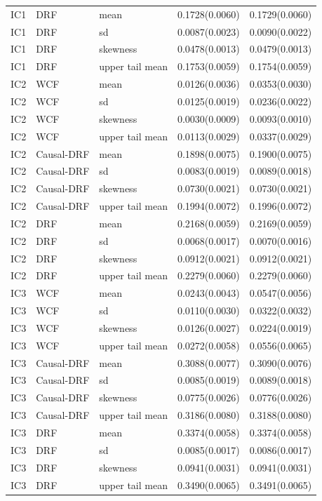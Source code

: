 \begin{longtable}{lllrr}
IC1 & DRF & mean & 0.1728(0.0060) & 0.1729(0.0060) \\
IC1 & DRF & sd & 0.0087(0.0023) & 0.0090(0.0022) \\
IC1 & DRF & skewness & 0.0478(0.0013) & 0.0479(0.0013) \\
IC1 & DRF & upper tail mean & 0.1753(0.0059) & 0.1754(0.0059) \\
IC2 & WCF & mean & 0.0126(0.0036) & 0.0353(0.0030) \\
IC2 & WCF & sd & 0.0125(0.0019) & 0.0236(0.0022) \\
IC2 & WCF & skewness & 0.0030(0.0009) & 0.0093(0.0010) \\
IC2 & WCF & upper tail mean & 0.0113(0.0029) & 0.0337(0.0029) \\
IC2 & Causal-DRF & mean & 0.1898(0.0075) & 0.1900(0.0075) \\
IC2 & Causal-DRF & sd & 0.0083(0.0019) & 0.0089(0.0018) \\
IC2 & Causal-DRF & skewness & 0.0730(0.0021) & 0.0730(0.0021) \\
IC2 & Causal-DRF & upper tail mean & 0.1994(0.0072) & 0.1996(0.0072) \\
IC2 & DRF & mean & 0.2168(0.0059) & 0.2169(0.0059) \\
IC2 & DRF & sd & 0.0068(0.0017) & 0.0070(0.0016) \\
IC2 & DRF & skewness & 0.0912(0.0021) & 0.0912(0.0021) \\
IC2 & DRF & upper tail mean & 0.2279(0.0060) & 0.2279(0.0060) \\
IC3 & WCF & mean & 0.0243(0.0043) & 0.0547(0.0056) \\
IC3 & WCF & sd & 0.0110(0.0030) & 0.0322(0.0032) \\
IC3 & WCF & skewness & 0.0126(0.0027) & 0.0224(0.0019) \\
IC3 & WCF & upper tail mean & 0.0272(0.0058) & 0.0556(0.0065) \\
IC3 & Causal-DRF & mean & 0.3088(0.0077) & 0.3090(0.0076) \\
IC3 & Causal-DRF & sd & 0.0085(0.0019) & 0.0089(0.0018) \\
IC3 & Causal-DRF & skewness & 0.0775(0.0026) & 0.0776(0.0026) \\
IC3 & Causal-DRF & upper tail mean & 0.3186(0.0080) & 0.3188(0.0080) \\
IC3 & DRF & mean & 0.3374(0.0058) & 0.3374(0.0058) \\
IC3 & DRF & sd & 0.0085(0.0017) & 0.0086(0.0017) \\
IC3 & DRF & skewness & 0.0941(0.0031) & 0.0941(0.0031) \\
IC3 & DRF & upper tail mean & 0.3490(0.0065) & 0.3491(0.0065) \\
\bottomrule
\end{longtable}
\endgroup

